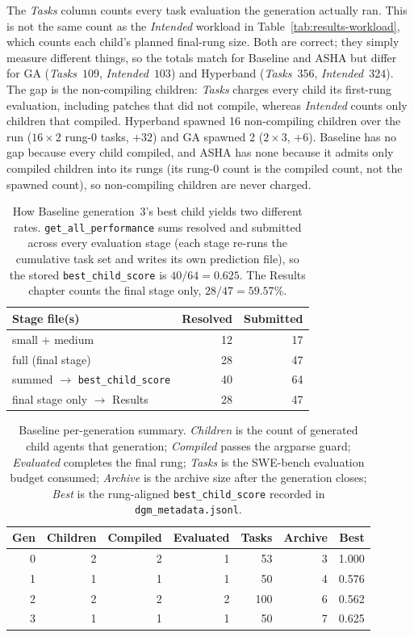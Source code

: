 The \emph{Tasks} column counts
every task evaluation the generation actually ran. This is not the same
count as the \emph{Intended} workload in
Table~\ref{tab:results-workload}, which counts each child's planned
final-rung size. Both are correct; they simply measure different things,
so the totals match for Baseline and ASHA but differ for GA
(\emph{Tasks}~$109$, \emph{Intended}~$103$) and Hyperband
(\emph{Tasks}~$356$, \emph{Intended}~$324$). The gap is the
non-compiling children: \emph{Tasks} charges every child its first-rung
evaluation, including patches that did not compile, whereas
\emph{Intended} counts only children that compiled. Hyperband spawned 16
non-compiling children over the run ($16 \times 2$ rung-0 tasks, $+32$)
and GA spawned 2 ($2 \times 3$, $+6$). Baseline has no gap because every
child compiled, and ASHA has none because it admits only compiled
children into its rungs (its rung-0 count is the compiled count, not the
spawned count), so non-compiling children are never charged.

\begin{table}[ht]
\centering
\caption{How Baseline generation~3's best child yields two different
rates. \texttt{get\_all\_performance} sums resolved and submitted across
every evaluation stage (each stage re-runs the cumulative task set and
writes its own prediction file), so the stored
\texttt{best\_child\_score} is $40/64 = 0.625$. The Results chapter
counts the final stage only, $28/47 = 59.57\%$.}
\label{tab:appendix-score-breakdown}
\begin{tabular}{lrr}
\hline
Stage file(s) & Resolved & Submitted \\
\hline
small + medium                           & 12 & 17 \\
full (final stage)                       & 28 & 47 \\
\hline
summed $\to$ \texttt{best\_child\_score} & 40 & 64 \\
final stage only $\to$ Results           & 28 & 47 \\
\hline
\end{tabular}
\end{table}

\begin{table}[ht]
\centering
\caption{Baseline per-generation summary. \emph{Children} is the count
of generated child agents that generation; \emph{Compiled} passes the
argparse guard; \emph{Evaluated} completes the final rung;
\emph{Tasks} is the SWE-bench evaluation budget consumed;
\emph{Archive} is the archive size after the generation closes;
\emph{Best} is the rung-aligned \texttt{best\_child\_score} recorded
in \texttt{dgm\_metadata.jsonl}.}
\label{tab:appendix-baseline}
\begin{tabular}{rrrrrrr}
\hline
Gen & Children & Compiled & Evaluated & Tasks & Archive & Best \\
\hline
0 & 2 & 2 & 1 &  53 & 3 & 1.000 \\
1 & 1 & 1 & 1 &  50 & 4 & 0.576 \\
2 & 2 & 2 & 2 & 100 & 6 & 0.562 \\
3 & 1 & 1 & 1 &  50 & 7 & 0.625 \\
\hline
\end{tabular}
\end{table}


